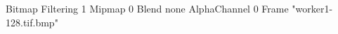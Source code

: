 {Bitmap
	{Filtering 1}
	{Mipmap 0}
	{Blend none}
	{AlphaChannel 0}
	{Frame "worker1-128.tif.bmp"}
}
